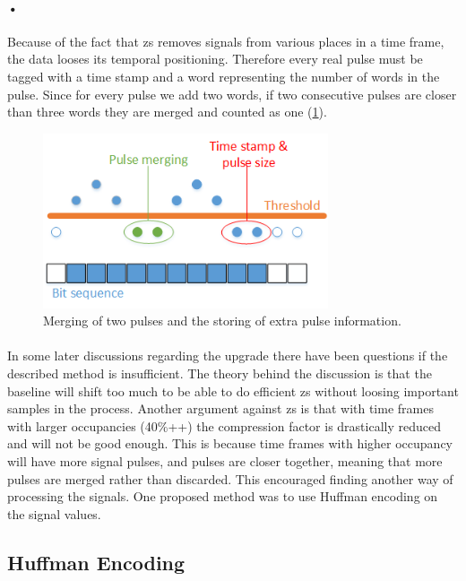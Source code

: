 \documentclass[a4paper, 12pt]{report}
\begin{document}
\paragraph{•}
Because of the fact that \gls{zs} removes signals from various places in a time frame, the data looses its temporal positioning.
Therefore every real pulse must be tagged with a time stamp and a word representing the number of words in the pulse.
Since for every pulse we add two words, if two consecutive pulses are closer than three words they are merged and counted as one (\ref{fig:merge}).

\begin{figure}[h!]
	\centering
		\includegraphics[width=0.75\textwidth]{images/merge.png}
		\caption{Merging of two pulses and the storing of extra pulse information.}
		\label{fig:merge}
\end{figure}

\paragraph{}
In some later discussions regarding the upgrade there have been questions if the described method is insufficient.
The theory behind the discussion is that the baseline will shift too much to be able to do efficient \gls{zs} without loosing important samples in the process.
Another argument against \gls{zs} is that with time frames with larger occupancies (40\%++) the compression factor is drastically reduced and will not be good enough.
This is because time frames with higher occupancy will have more signal pulses, and pulses are closer together, meaning that more pulses are merged rather than discarded. 
This encouraged finding another way of processing the signals.
One proposed method was to use Huffman encoding on the signal values.

\subsection{Huffman Encoding} %
\end{document}

